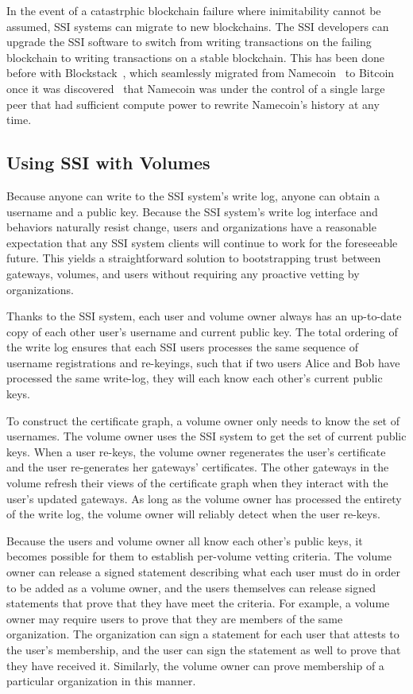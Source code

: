 In the event of a catastrphic blockchain failure where inimitability
cannot be assumed, SSI systems can migrate to new blockchains.  The SSI
developers can upgrade the SSI software to switch from writing transactions on
the failing blockchain to writing transactions on a stable blockchain.  This has
been done before with Blockstack~\cite{blockstack-namecoin-migration}, which
seamlessly migrated from Namecoin~\cite{namecoin} to Bitcoin once it was
discovered~\cite{blockstack} that Namecoin was under the control of a single
large peer that had sufficient compute power to rewrite Namecoin's history
at any time.

\subsection{Using SSI with Volumes}

Because anyone can write to the SSI system's write log, anyone can obtain a
username and a public key.  Because the SSI system's write log interface and
behaviors naturally resist change, users and organizations have a reasonable
expectation that any SSI system clients will continue to work for the
foreseeable future.  This yields a straightforward solution to bootstrapping
trust between gateways, volumes, and users without requiring any proactive
vetting by organizations.

Thanks to the SSI system, each user and volume owner always has an up-to-date
copy of each other user's username and current public key.  The total ordering
of the write log ensures that each SSI users processes the same sequence of
username registrations and re-keyings, such that if two users Alice and Bob have
processed the same write-log, they will each know each other's current public
keys.

To construct the certificate graph, a volume owner only needs to know the set of
usernames.  The volume owner uses the SSI system to get the set of current
public keys.  When a user re-keys, the volume owner regenerates the user's
certificate and the user re-generates her gateways' certificates.  The other
gateways in the volume refresh their views of the certificate graph when they
interact with the user's updated gateways.  As long as the volume owner has
processed the entirety of the write log, the volume owner will reliably detect
when the user re-keys.

Because the users and volume owner all know each other's public keys, it becomes
possible for them to establish per-volume vetting criteria.  The volume owner
can release a signed statement describing what each user must do in order to be
added as a volume owner, and the users themselves can release signed statements
that prove that they have meet the criteria.  For example, a volume owner may
require users to prove that they are members of the same organization.  The
organization can sign a statement for each user that attests to the user's
membership, and the user can sign the statement as well to prove that they have
received it.  Similarly, the volume owner can prove membership of a particular
organization in this manner.

